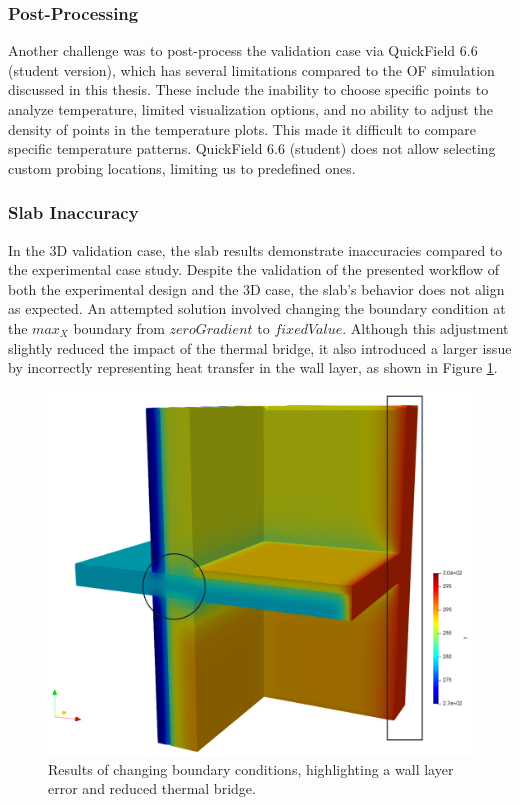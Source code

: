 \subsubsection{Post-Processing}
Another challenge was to post-process the validation case via QuickField 6.6 (student version), which has several limitations compared to the \gls{OF} simulation discussed in this thesis. 
These include the inability to choose specific points to analyze temperature, limited visualization options, and no ability to adjust the density of points in the temperature plots. This made it difficult to compare specific temperature patterns.
QuickField 6.6 (student) does not allow selecting custom probing locations, limiting us to predefined ones.


\subsubsection{Slab Inaccuracy}
In the 3D validation case, the slab results demonstrate inaccuracies compared to the experimental case study. Despite the validation of the presented workflow of both the experimental design and the 3D case, the slab's behavior does not align as expected. An attempted solution involved changing the boundary condition at the $max_X$ boundary from $zeroGradient$ to $fixedValue$.
Although this adjustment slightly reduced the impact of the thermal bridge, it also introduced a larger issue by incorrectly representing heat transfer in the wall layer, as shown in Figure \ref{maxx}.


\begin{figure}[tb]
\centering
\includegraphics[width=0.75\columnwidth]{Figures/maxx.png}
\hspace{0.7cm}
\caption[Slab Validation]{Results of changing boundary conditions, highlighting a wall layer error and reduced thermal bridge.}
\label{maxx}
\end{figure}


